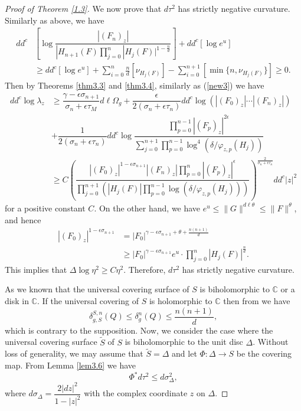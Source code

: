 \documentclass[12pt,article]{amsart}
\newcommand{\C}{{\mathbb{C}}}
\numberwithin{equation}{section}
\begin{document}
\begin{proof}[Proof of Theorem \ref{1.3}]
We now prove that $d\tau^2$ has strictly negative curvature. Similarly as above, we have
\begin{align*}
dd^c&\left[\log\dfrac{|(F_n)_z|}{|H_{n+1}(F)\prod_{j=0}^{n}|H_j(F)|^{1-\frac{n}{d}}}\right]+dd^c[\log e^u]\\
&\ge dd^c[\log e^u]+\sum_{i=0}^n\frac{n}{d}[\nu_{H_j(F)}]-\sum_{i=0}^{n+1}[\min\{n,\nu_{H_j(F)}\}]\ge 0.
\end{align*}
Then by Theorems \ref{thm3.3} and \ref{thm3.4}, similarly as (\ref{new3}) we have
\begin{align*}
dd^c\log\lambda_z&\ge\dfrac{\gamma-\epsilon\sigma_{n+1}}{\sigma_n+\epsilon\tau_M}d\ell\Omega_g+\dfrac{\epsilon}{2(\sigma_n+\epsilon\tau_n)}dd^c\log\left(|(F_0)_z|\cdots|(F_n)_z|\right)\\
& +\dfrac{1}{2(\sigma_n+\epsilon\tau_n)}dd^c\log\dfrac{\prod_{p=0}^{n-1}|(F_p)_z|^{2\epsilon}}{\sum_{j=0}^{n+1}\prod_{p=0}^{n-1}\log^{4}(\delta/\varphi_{z,p}(H_j))}\\
&\ge C\left (\dfrac{|(F_0)_z|^{1-\epsilon\sigma_{n+1}}|(F_n)_z|\prod_{p=0}^n|(F_p)_z|^\epsilon}{\prod_{j=0}^{n+1}(|H_j(F)|\prod_{p=0}^{n-1}\log(\delta/\varphi_{z,p}(H_j)))}\right)^{\frac{2}{\sigma_n+\epsilon\tau_n}}dd^c|z|^2
\end{align*}
for a positive constant $C$. On the other hand, we have $e^u\le \|G\|^{d\ell\theta}\le\|F\|^{\theta}$, and hence
\begin{align*}
|(F_{0})_z|^{1-\epsilon\sigma_{n+1}}&=|F_{0}|^{\gamma-\epsilon\sigma_{n+1}+\theta+\frac{n(n+1)}{d}}\\
&\ge |F_{0}|^{\gamma-\epsilon\sigma_{n+1}}e^u\cdot\prod_{j=0}^n|H_j(F)|^{\frac{n}{d}}.
\end{align*}
This implies that $\Delta \log\eta^2\ge C\eta^2$. Therefore, $d\tau^2$ has strictly negative curvature.

As we known that the universal covering surface of $S$ is biholomorphic to $\C$ or a disk in $\C$. If the universal covering of $S$ is holomorphic to $\C$ then from \cite[Lemma 3]{QT} we have
$$\delta^{S,n}_{g,S}(Q)\le\delta_g^n(Q)\le \dfrac{n(n+1)}{d},$$
which is contrary to the supposition. Now, we consider the case where the universal covering surface $\tilde S$ of $S$ is biholomorphic to the unit disc $\Delta$. Without loss of generality, we may assume that $\tilde S=\Delta$ and let $\Phi :\Delta\rightarrow S$ be the covering map. From Lemma \ref{lem3.6} we have
$$ \Phi^*d\tau^2\le d\sigma_{\Delta}^2,$$
where $d\sigma_{\Delta}=\dfrac{2|dz|^2}{1-|z|^2}$ with the complex coordinate $z$ on $\Delta$.


\end{proof}
\end{document}
